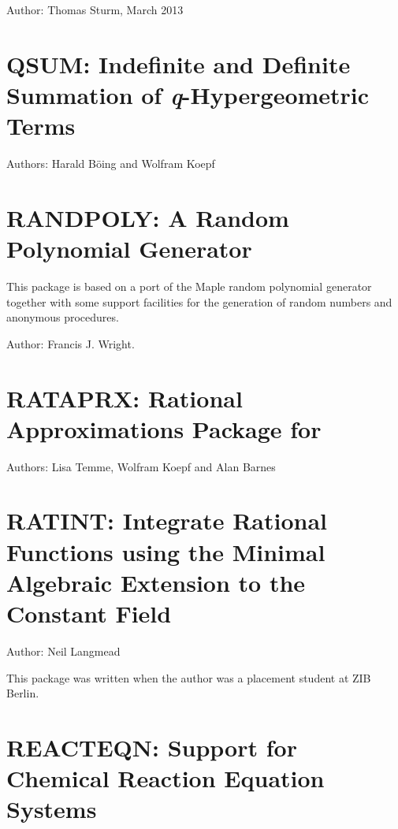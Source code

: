 Author: Thomas Sturm, March 2013

\newpage


\section{QSUM: Indefinite and Definite Summation
of \textsl{q}-Hypergeometric Terms}

Authors: Harald B\"{o}ing and Wolfram Koepf



\newpage

\section{RANDPOLY: A Random Polynomial Generator}

This package is based on a port of the Maple random polynomial
generator together with some support facilities for the generation
of random numbers and anonymous procedures.

Author: Francis J. Wright.



\newpage

\section{RATAPRX: Rational Approximations Package for \REDUCE}

Authors: Lisa Temme, Wolfram Koepf and Alan Barnes



\newpage

\section{RATINT: Integrate Rational Functions using the Minimal Algebraic                                                                                                                           Extension to the Constant Field}

Author: Neil Langmead

This package was written when the author was a placement student at ZIB Berlin.



\newpage

\section{REACTEQN: Support for Chemical Reaction Equation Systems}

